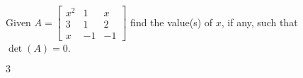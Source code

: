 
\begin{Exercise}[
name={},
title={}, 
difficulty=0,
origin={\cite{BS}}]
Given
$
A=
\begin{bmatrix}
x^2 & 1 & x\\
3 & 1 & 2\\
x & -1 & -1
\end{bmatrix}
$
find the value(s) of $x$, if any, such that $\det(A)=0$.
\end{Exercise}
\begin{Answer}
$3$
\end{Answer}
